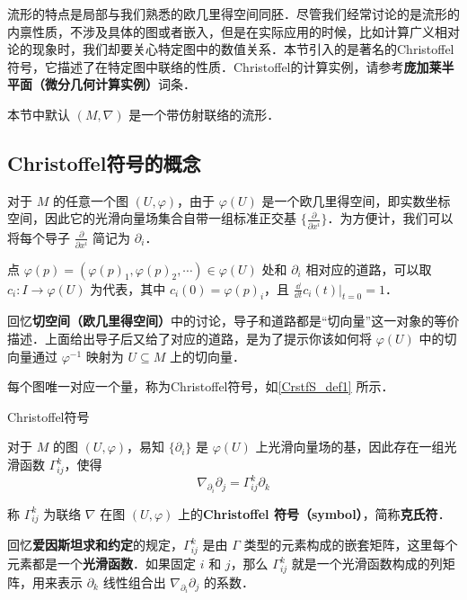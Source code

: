 

流形的特点是局部与我们熟悉的欧几里得空间同胚．尽管我们经常讨论的是流形的内禀性质，不涉及具体的图或者嵌入，但是在实际应用的时候，比如计算广义相对论的现象时，我们却要关心特定图中的数值关系．本节引入的是著名的Christoffel符号，它描述了在特定图中联络的性质．Christoffel的计算实例，请参考\textbf{庞加莱半平面（微分几何计算实例）}词条．

本节中默认 $(M, \nabla)$ 是一个带仿射联络的流形．


\subsection{Christoffel符号的概念}\label{CrstfS_sub1}

对于 $M$ 的任意一个图 $(U, \varphi)$，由于 $\varphi(U)$ 是一个欧几里得空间，即实数坐标空间，因此它的光滑向量场集合自带一组标准正交基 $\{\frac{\partial}{\partial x^i}\}$．为方便计，我们可以将每个导子 $\frac{\partial}{\partial x^i}$ 简记为 $\partial_i$．

点 $\varphi(p)=(\varphi(p)_1, \varphi(p)_2, \cdots)\in\varphi(U)$ 处和 $\partial_i$ 相对应的道路，可以取 $c_i:I\to \varphi(U)$ 为代表，其中 $c_i(0)=\varphi(p)_i$，且 $\frac{\dd}{\dd t}c_i(t)|_{t=0}=1$．

回忆\textbf{切空间（欧几里得空间）}中的讨论，导子和道路都是“切向量”这一对象的等价描述．上面给出导子后又给了对应的道路，是为了提示你该如何将 $\varphi(U)$ 中的切向量通过 $\varphi^{-1}$ 映射为 $U\subseteq M$ 上的切向量．

每个图唯一对应一个量，称为Christoffel符号，如\autoref{CrstfS_def1} 所示．

\begin{definition}{Christoffel符号}\label{CrstfS_def1}

对于 $M$ 的图 $(U, \varphi)$，易知 $\{\partial_i\}$ 是 $\varphi(U)$ 上光滑向量场的基，因此存在一组光滑函数 $\Gamma^k_{ij}$，使得
\begin{equation}
\nabla_{\partial_i}\partial_j=\Gamma^k_{ij}\partial_k
\end{equation}

称 $\Gamma^k_{ij}$ 为联络 $\nabla$ 在图 $(U, \varphi)$ 上的\textbf{Christoffel 符号（symbol）}，简称\textbf{克氏符}．
\end{definition}

回忆\textbf{爱因斯坦求和约定}的规定，$\Gamma^k_{ij}$ 是由 $\Gamma$ 类型的元素构成的嵌套矩阵，这里每个元素都是一个\textbf{光滑函数}．如果固定 $i$ 和 $j$，那么 $\Gamma^k_{ij}$ 就是一个光滑函数构成的列矩阵，用来表示 $\partial_k$ 线性组合出 $\nabla_{\partial_i}\partial_j$ 的系数．

